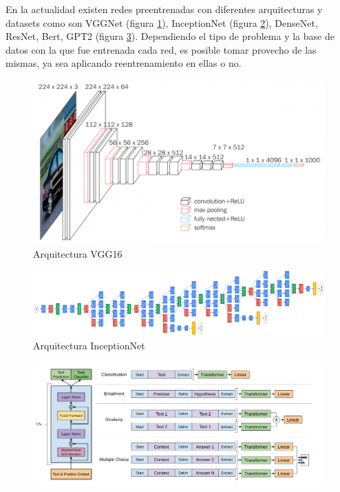 En la actualidad existen redes preentrenadas con diferentes arquitecturas y datasets como son VGGNet (figura \ref{fig:vgg16}), InceptionNet (figura \ref{fig:googlenet}), DenseNet, ResNet, Bert, GPT2 (figura \ref{fig:gpt2}). Dependiendo el tipo de problema y la base de datos con la que fue entrenada cada red, es posible tomar provecho de las mismas, ya sea aplicando reentrenamiento en ellas o no.
\begin{figure}
	\centering
	\includegraphics[width=1\linewidth]{images/vgg16}
	\caption[Arquitectura VGG16]{Arquitectura VGG16}
	\label{fig:vgg16}
\end{figure}

\begin{figure}
	\centering
	\includegraphics[width=1\linewidth]{images/googlenet}
	\caption[Arquitectura InceptionNet]{Arquitectura InceptionNet}
	\label{fig:googlenet}
\end{figure}

\begin{figure}
	\centering
	\includegraphics[width=1\linewidth]{images/gpt2}
	\caption[Arquitectura GPT2]{}
	\label{fig:gpt2}
\end{figure}

